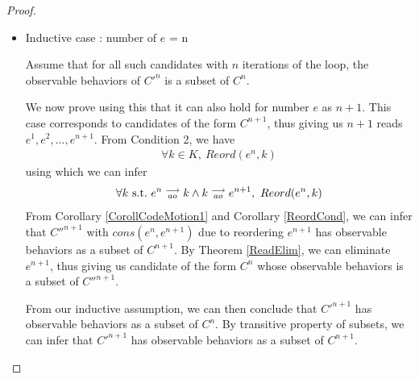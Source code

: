 \begin{proof}
\begin{itemize}
                    \item Inductive case : number of $e$ = n

                    Assume that for all such candidates with $n$ iterations of the loop, the observable behaviors of $C'^n$ is a subset of $C^n$.

                    We now prove using this that it can also hold for number $e$ as $n + 1$. 
                    This case corresponds to candidates of the form $C^{n+1}$, thus giving us $n+1$ reads $e^1, e^2,...,e^{n+1}$.
                    From Condition 2, we have
                    \begin{align*}
                        \forall k \in K, \ Reord(e^{n}, k)
                    \end{align*}
                    using which we can infer 
                    \begin{align*}
                        \forall k \ \text{s.t.} \ e^n\stackrel{\longrightarrow}{_{ao}}k \wedge k\stackrel{\longrightarrow}{_{ao}}e^{n+1}, \ Reord(e^{n}, k)
                    \end{align*}
                    From Corollary \ref{CorollCodeMotion1} and Corollary \ref{ReordCond}, we can infer that $C''^{n+1}$ with $cons(e^n, e^{n+1})$ due to reordering $e^{n+1}$ has observable behaviors as a subset of $C^{n+1}$. 
                    By Theorem \ref{ReadElim}, we can eliminate $e^{n+1}$, thus giving us candidate of the form $C^n$ whose observable behaviors is a subset of $C''^{n+1}$.

                    From our inductive assumption, we can then conclude that $C'^{n+1}$ has observable behaviors as a subset of $C^n$. 
                    By transitive property of subsets, we can infer that $C'^{n+1}$ has observable behaviors as a subset of $C^{n+1}$.



                \end{itemize}
                
            \end{proof}
            
